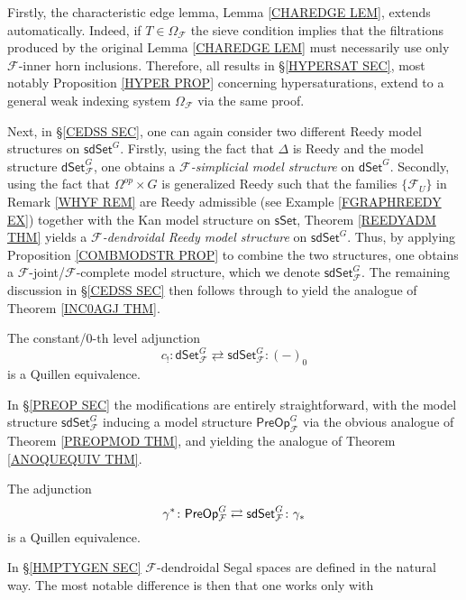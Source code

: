 \documentclass[a4paper,10pt
,draft
]{article}%
\begin{document}
Firstly, the characteristic edge lemma, Lemma \ref{CHAREDGE LEM}, extends automatically. Indeed, if $T \in \Omega_{\mathcal{F}}$ the sieve condition implies
that the filtrations produced by the original 
Lemma \ref{CHAREDGE LEM} must necessarily use only 
$\mathcal{F}$-inner horn inclusions.
Therefore, all results in \S \ref{HYPERSAT SEC}, 
most notably Proposition \ref{HYPER PROP} concerning hypersaturations,
extend to a general weak indexing system $\Omega_{\mathcal{F}}$
via the same proof.

Next, in \S \ref{CEDSS SEC}, one can again consider two different Reedy model structures on 
$\mathsf{sdSet}^G$.
Firstly, using the fact that $\Delta$ is Reedy and the model structure $\mathsf{dSet}^G_{\mathcal{F}}$, one obtains a
\textit{$\mathcal{F}$-simplicial model structure} on
$\mathsf{dSet}^G$.
Secondly, using the fact that $\Omega^{op} \times G$ is generalized Reedy such that the families 
$\{\mathcal{F}_U\}$ in Remark \ref{WHYF REM}
are Reedy admissible (see Example \ref{FGRAPHREEDY EX})
together with the Kan model structure on 
$\mathsf{sSet}$, Theorem \ref{REEDYADM THM} yields a 
\textit{$\mathcal{F}$-dendroidal Reedy model structure}
on $\mathsf{sdSet}^G$.
Thus, by applying Proposition \ref{COMBMODSTR PROP} to combine the two structures,
one obtains a $\mathcal{F}$-joint/$\mathcal{F}$-complete model structure, which we denote
$\mathsf{sdSet}^G_{\mathcal{F}}$.
The remaining discussion in \S \ref{CEDSS SEC} then follows through to yield the analogue of Theorem \ref{INC0AGJ THM}.
\begin{theorem}\label{FINC0AGJ THM}
	The constant/$0$-th level adjunction
	\[
	c_!\colon 
	\mathsf{dSet}^G_{\mathcal{F}} \rightleftarrows \mathsf{sdSet}^G_{\mathcal{F}}
	\colon (-)_0
	\]
	is a Quillen equivalence.
\end{theorem}
In \S \ref{PREOP SEC} the modifications are entirely straightforward, with the model structure 
$\mathsf{sdSet}^G_{\mathcal{F}}$
inducing a model structure
$\mathsf{PreOp}^G_{\mathcal{F}}$ via the obvious analogue of 
Theorem \ref{PREOPMOD THM}, and yielding the analogue of Theorem \ref{ANOQUEQUIV THM}.
\begin{theorem}\label{FANOQUEQUIV THM}
The adjunction
\[
	\gamma^{\**} \colon \mathsf{PreOp}^G_{\mathcal{F}}
\rightleftarrows
	\mathsf{sdSet}^G_{\mathcal{F}} \colon \gamma_{\**}
\]
is a Quillen equivalence.
\end{theorem}
In \S \ref{HMPTYGEN SEC} $\mathcal{F}$-dendroidal Segal spaces are defined in the natural way. The most notable difference is then that one works only with 
\end{document}

